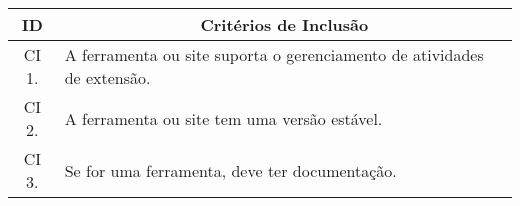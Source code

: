 \begin{table}[!htb]
  \centering
  \footnotesize
  \begin{tabular}{c|p{8cm}}
    \bottomrule
    \rowcolor[rgb]{0.753,0.753,0.753} \textbf{ID} & \multicolumn{1}{c}{\textbf{Critérios de Inclusão}}                      \\
    \hline
    \rowcolor[HTML]{DEDEDE}
    CI 1.                                         & A ferramenta ou site suporta o gerenciamento de atividades de extensão. \\
    CI 2.                                         & A ferramenta ou site tem uma versão estável.                            \\
    \rowcolor[HTML]{DEDEDE}
    CI 3.                                         & Se for uma ferramenta, deve ter documentação.                           \\
    \toprule
  \end{tabular}
\end{table}
